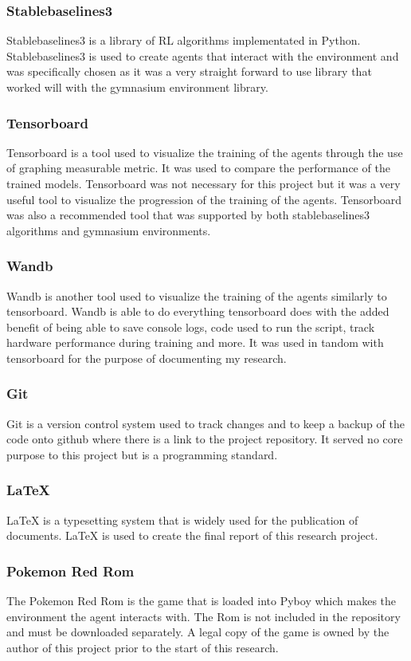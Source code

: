 \subsubsection*{Stablebaselines3}
Stablebaselines3 is a library of RL algorithms implementated in Python. Stablebaselines3 is used to create agents that interact with the environment and was specifically chosen as it was a very straight forward to use library that worked will with the gymnasium environment library.

\subsubsection*{Tensorboard}
Tensorboard is a tool used to visualize the training of the agents through the use of graphing measurable metric. It was used to compare the performance of the trained models. Tensorboard was not necessary for this project but it was a very useful tool to visualize the progression of the training of the agents. Tensorboard was also a recommended tool that was supported by both stablebaselines3 algorithms and gymnasium environments.

\subsubsection*{Wandb}
Wandb is another tool used to visualize the training of the agents similarly to tensorboard. Wandb is able to do everything tensorboard does with the added benefit of being able to save console logs, code used to run the script, track hardware performance during training and more. It was used in tandom with tensorboard for the purpose of documenting my research.

\subsubsection*{Git}
Git is a version control system used to track changes and to keep a backup of the code onto github where there is a link to the project repository. It served no core purpose to this project but is a programming standard. 

\subsubsection*{LaTeX}
LaTeX is a typesetting system that is widely used for the publication of documents. LaTeX is used to create the final report of this research project.

\subsubsection*{Pokemon Red Rom}
The Pokemon Red Rom is the game that is loaded into Pyboy which makes the environment the agent interacts with. The Rom is not included in the repository and must be downloaded separately. A legal copy of the game is owned by the author of this project prior to the start of this research.


